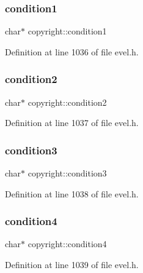 \subsubsection{\texorpdfstring{condition1}{condition1}}
{\footnotesize\ttfamily char$\ast$ copyright\+::condition1}



Definition at line 1036 of file evel.\+h.

\hypertarget{structcopyright_aec75dccb61ec6069ab97b0e57d790a2e}{}\label{structcopyright_aec75dccb61ec6069ab97b0e57d790a2e} 
\subsubsection{\texorpdfstring{condition2}{condition2}}
{\footnotesize\ttfamily char$\ast$ copyright\+::condition2}



Definition at line 1037 of file evel.\+h.

\hypertarget{structcopyright_aab08f4c8d2ecbedbe81584a37a0cec2c}{}\label{structcopyright_aab08f4c8d2ecbedbe81584a37a0cec2c} 
\subsubsection{\texorpdfstring{condition3}{condition3}}
{\footnotesize\ttfamily char$\ast$ copyright\+::condition3}



Definition at line 1038 of file evel.\+h.

\hypertarget{structcopyright_a4290d46b5c4ce72b712df3949081091e}{}\label{structcopyright_a4290d46b5c4ce72b712df3949081091e} 
\subsubsection{\texorpdfstring{condition4}{condition4}}
{\footnotesize\ttfamily char$\ast$ copyright\+::condition4}



Definition at line 1039 of file evel.\+h.

\hypertarget{structcopyright_a8b4cae8b24b51509a3f998d164699ca9}{}\label{structcopyright_a8b4cae8b24b51509a3f998d164699ca9} 

